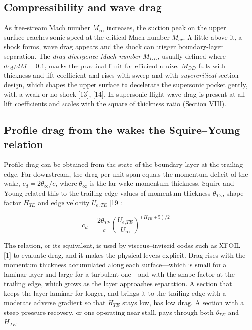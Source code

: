 \documentclass[10pt,a4paper,twocolumn]{article}
\begin{document}
\hypertarget{compressibility-and-wave-drag}{%
\subsection{Compressibility and wave
drag}\label{compressibility-and-wave-drag}}

As free-stream Mach number \(M_\infty\) increases, the suction peak on
the upper surface reaches sonic speed at the critical Mach number
\(M_{cr}\). A little above it, a shock forms, wave drag appears and the
shock can trigger boundary-layer separation. The \emph{drag-divergence
Mach number} \(M_{DD}\), usually defined where \(dc_d/dM = 0.1\), marks
the practical limit for efficient cruise. \(M_{DD}\) falls with
thickness and lift coefficient and rises with sweep and with
\emph{supercritical} section design, which shapes the upper surface to
decelerate the supersonic pocket gently, with a weak or no shock
{[}13{]}, {[}14{]}. In supersonic flight wave drag is present at all
lift coefficients and scales with the square of thickness ratio (Section
VIII).

\hypertarget{profile-drag-from-the-wake-the-squireyoung-relation}{%
\subsection{Profile drag from the wake: the Squire--Young
relation}\label{profile-drag-from-the-wake-the-squireyoung-relation}}

Profile drag can be obtained from the state of the boundary layer at the
trailing edge. Far downstream, the drag per unit span equals the
momentum deficit of the wake, \(c_d = 2\theta_\infty/c\), where
\(\theta_\infty\) is the far-wake momentum thickness. Squire and Young
related this to the trailing-edge values of momentum thickness
\(\theta_{TE}\), shape factor \(H_{TE}\) and edge velocity \(U_{e,TE}\)
{[}19{]}:

\[c_d = \frac{2\theta_{TE}}{c}\left(\frac{U_{e,TE}}{U_\infty}\right)^{(H_{TE}+5)/2} \tag{4}\]

The relation, or its equivalent, is used by viscous--inviscid codes such
as XFOIL {[}1{]} to evaluate drag, and it makes the physical levers
explicit. Drag rises with the momentum thickness accumulated along each
surface---which is small for a laminar layer and large for a turbulent
one---and with the shape factor at the trailing edge, which grows as the
layer approaches separation. A section that keeps the layer laminar for
longer, and brings it to the trailing edge with a moderate adverse
gradient so that \(H_{TE}\) stays low, has low drag. A section with a
steep pressure recovery, or one operating near stall, pays through both
\(\theta_{TE}\) and \(H_{TE}\).
\end{document}
